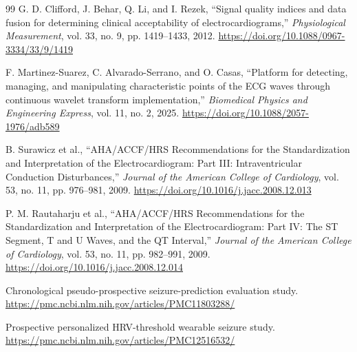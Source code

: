 \documentclass[11pt,a4paper]{article}
\begin{document}
\begin{thebibliography}{99}
G. D. Clifford, J. Behar, Q. Li, and I. Rezek, ``Signal quality indices and data fusion for determining clinical acceptability of electrocardiograms,'' \emph{Physiological Measurement}, vol. 33, no. 9, pp. 1419--1433, 2012. \url{https://doi.org/10.1088/0967-3334/33/9/1419}

F. Martinez-Suarez, C. Alvarado-Serrano, and O. Casas, ``Platform for detecting, managing, and manipulating characteristic points of the ECG waves through continuous wavelet transform implementation,'' \emph{Biomedical Physics and Engineering Express}, vol. 11, no. 2, 2025. \url{https://doi.org/10.1088/2057-1976/adb589}

B. Surawicz et al., ``AHA/ACCF/HRS Recommendations for the Standardization and Interpretation of the Electrocardiogram: Part III: Intraventricular Conduction Disturbances,'' \emph{Journal of the American College of Cardiology}, vol. 53, no. 11, pp. 976--981, 2009. \url{https://doi.org/10.1016/j.jacc.2008.12.013}

P. M. Rautaharju et al., ``AHA/ACCF/HRS Recommendations for the Standardization and Interpretation of the Electrocardiogram: Part IV: The ST Segment, T and U Waves, and the QT Interval,'' \emph{Journal of the American College of Cardiology}, vol. 53, no. 11, pp. 982--991, 2009. \url{https://doi.org/10.1016/j.jacc.2008.12.014}

Chronological pseudo-prospective seizure-prediction evaluation study. \url{https://pmc.ncbi.nlm.nih.gov/articles/PMC11803288/}

Prospective personalized HRV-threshold wearable seizure study. \url{https://pmc.ncbi.nlm.nih.gov/articles/PMC12516532/}

\end{thebibliography}
\end{document}

